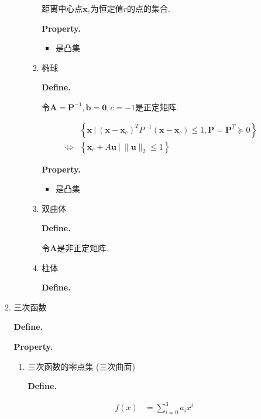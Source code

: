 \documentclass{article}
\begin{document}
\begin{enumerate}
\begin{enumerate}
\begin{enumerate}
\begin{enumerate}
								距离中心点$\boldsymbol x_c$为恒定值$r$的点的集合.\par
							\textbf{Property. }\par
								\begin{itemize}
								\item 是凸集\par
								\end{itemize}
						\item 椭球\par
							\textbf{Define. }\par
								令$\boldsymbol A = \boldsymbol P^{-1}, \boldsymbol b = \boldsymbol 0, c = -1$是正定矩阵.\par
								\begin{align*}
&\left\{ \boldsymbol x \ |\ \left(\boldsymbol x - \boldsymbol x_c\right)^T P^{-1} \left(\boldsymbol x - \boldsymbol x_c\right) \le  1, \boldsymbol P = \boldsymbol P^T \succeq  0\right\}\\
\Leftrightarrow &\left\{ \boldsymbol x_c + A \boldsymbol u \ |\ \| \boldsymbol u\| _2 \le  1\right\}  \tag{等价}
\end{align*}

							\textbf{Property. }\par
								\begin{itemize}
								\item 是凸集\par
								\end{itemize}
						\item 双曲体\par
							\textbf{Define. }\par
								令$\boldsymbol A$是非正定矩阵.\par
						\item 柱体\par
							\textbf{Define. }\par
						\end{enumerate}\par
				\end{enumerate}\par
		\item 三次函数\par
			\textbf{Define. }\par
			\textbf{Property. }\par
				\begin{enumerate}\par
				\item 三次函数的零点集 (三次曲面)\par
					\textbf{Define. }\par
						\begin{align*}
f\left(x\right) &= \sum\limits_{i=0}^{3} a_i x^i  \tag{一元}
\end{align*}


\end{enumerate}
\end{enumerate}
\end{enumerate}
\end{document}
